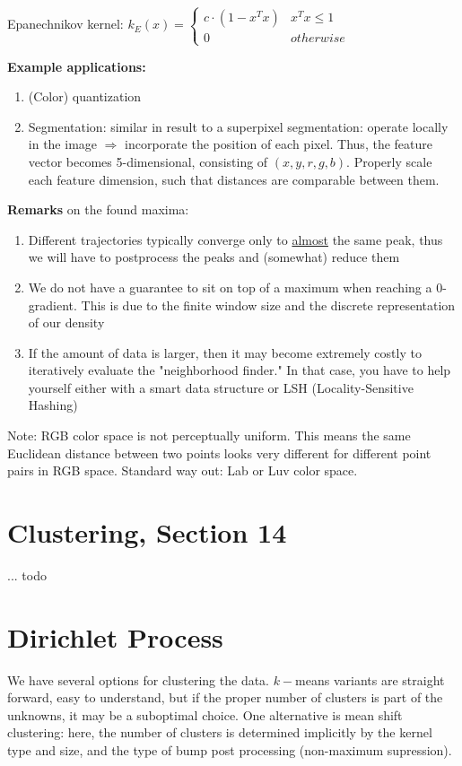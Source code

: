 \documentclass{scrartcl}
\begin{document}
Epanechnikov kernel: \(k_{E} (x) = 
\begin{cases} 
    c \cdot (1-x^Tx) & x^Tx \leq 1\\
    0 & otherwise
\end{cases}\) 

\textbf{Example applications:}
\begin{enumerate}
    \item
        (Color) quantization
    \item
        Segmentation: similar in result to a superpixel segmentation: operate locally in the image \(\Rightarrow\) incorporate the position of each pixel. Thus, the feature vector becomes 5-dimensional, consisting of \((x, y, r, g, b)\). Properly scale each feature dimension, such that distances are comparable between them.
\end{enumerate}

\textbf{Remarks} on the found maxima:
\begin{enumerate}
    \item
        Different trajectories typically converge only to \underline{almost} the same peak, thus we will have to postprocess the peaks and (somewhat) reduce them
    \item
        We do not have a guarantee to sit on top of a maximum when reaching a 0-gradient. This is due to the finite window size and the discrete representation of our density
    \item
        If the amount of data is larger, then it may become extremely costly to iteratively evaluate the "neighborhood finder." In that case, you have to help yourself either with a smart data structure or LSH (Locality-Sensitive Hashing)
\end{enumerate}

Note: RGB color space is not perceptually uniform. This means the same Euclidean distance between two points looks very different for different point pairs in RGB space. Standard way out: Lab or Luv color space.

\section{Clustering, Section 14}
... todo

\section{Dirichlet Process}
We have several options for clustering the data. \(k-\)means variants are straight forward, easy to understand, but if the proper number of clusters is part of the unknowns, it may be a suboptimal choice. One alternative is mean shift clustering: here, the number of clusters is determined implicitly by the kernel type and size, and the type of bump post processing (non-maximum supression).
\end{document}
